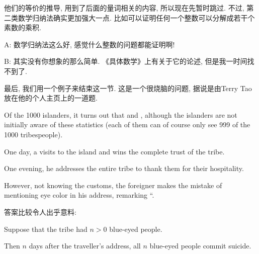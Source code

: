 他们的等价的推导, 用到了后面的量词相关的内容, 所以现在先暂时跳过. 不过, 第二类数学归纳法确实更加强大一点. 比如可以证明任何一个整数可以分解成若干个素数的乘积. 

\begin{dialogue}
	A: 数学归纳法这么好, 感觉什么整数的问题都能证明啊! 
	
	B: 其实没有你想象的那么简单. 《具体数学》上有关于它的论述, 但是我一时间找不到了. 
\end{dialogue}


最后, 我们用一个例子来结束这一节. 这是一个很烧脑的问题, 据说是由Terry Tao放在他的个人主页上的一道题. 

\begin{prob}
      Of the 1000 islanders,
    it turns out that 
    and ,
    although the islanders are not initially aware of these statistics
    (each of them can of course only see 999 of the 1000 tribespeople). 

    One day, a  visits to the island
    and wins the complete trust of the tribe. 

    One evening, he addresses the entire tribe to thank them
    for their hospitality. 

    However, not knowing the customs,
    the foreigner makes the mistake of mentioning eye color in his address,
    remarking ``. 

\end{prob}

答案比较令人出乎意料:

\begin{theorem}
      Suppose that the tribe had $n > 0$ blue-eyed people. 
      
      Then $n$ days after the traveller's address, all $n$ blue-eyed people commit suicide.
\end{theorem}

